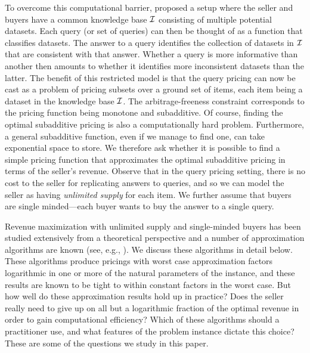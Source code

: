 To overcome this computational barrier, \citet{deep2017qirana} proposed a setup where the seller and buyers have a common knowledge base $\mathcal{I}$ consisting of multiple potential datasets. Each query (or set of queries) can then be thought of as a function that classifies datasets. The answer to a query identifies the collection of datasets in $\mathcal{I}$ that are consistent with that answer. Whether a query is more informative than another then amounts to whether it identifies more inconsistent datasets than the latter. The benefit of this restricted model is that the query pricing can now be cast as a problem of pricing subsets over a ground set of items, each item being a dataset in the knowledge base $\mathcal{I}$. The arbitrage-freeness constraint corresponds to the pricing function being monotone and subadditive. Of course, finding the optimal subadditive pricing is also a computationally hard problem. Furthermore, a general subadditive function, even if we manage to find one, can take exponential space to store. We therefore ask whether it is possible to find a simple pricing function that approximates the optimal subadditive pricing in terms of the seller's revenue. Observe that in the query pricing setting, there is no cost to the seller for replicating answers to queries, and so we can model the seller as having {\em unlimited supply} for each item. We further assume that buyers are single minded---each buyer wants to buy the answer to a single query.


Revenue maximization with unlimited supply and single-minded buyers has been studied extensively from a theoretical perspective and a number of approximation algorithms are known (see, e.g., \cite{guruswami2005profit,balcan2006approximation,briest2006single}). We discuss these algorithms in detail below. These algorithms produce pricings with worst case approximation factors logarithmic in one or more of the natural parameters of the instance, and these results are known to be tight to within constant factors in the worst case. But how well do these approximation results hold up in practice? Does the seller really need to give up on all but a logarithmic fraction of the optimal revenue in order to gain computational efficiency? Which of these algorithms should a practitioner use, and what features of the problem instance dictate this choice? These are some of the questions we study in this paper.



